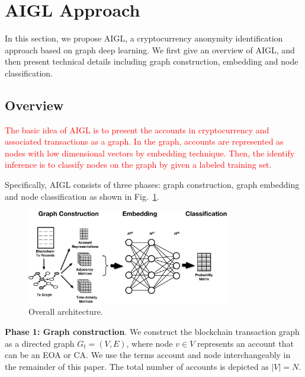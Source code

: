 \section{AIGL Approach}
\label{sec:approach}
In this section, we propose AIGL, a cryptocurrency anonymity identification approach based on graph deep learning. We first give an overview of AIGL, and then present technical details including graph construction, embedding and node classification.


\subsection{Overview}
\label{subsec:methodology}
\textcolor{red}{The basic idea of AIGL is to present the accounts in cryptocurrency and associated transactions as a graph. In the graph, accounts are represented as nodes with low dimensional vectors by embedding technique. Then, the identify inference is to classify nodes on the graph by given a labeled training set.}

Specifically, AIGL consists of three phases: graph construction, graph embedding and node classification as shown in Fig.~\ref{fig:architecture}.

\begin{figure}[htbp]
	\centering
	\includegraphics[width=3.5in]{fig/architecture.eps}
	\caption{Overall architecture.}
	\label{fig:architecture}
\end{figure}

\textbf{Phase 1: Graph construction}. We construct the blockchain transaction graph as a directed graph $G_{t}=(V,E)$, where node $v \in V$ represents an account that can be an EOA or CA. We use the terms account and node interchangeably in the remainder of this paper. The total number of accounts is depicted as $|V|=N$.

